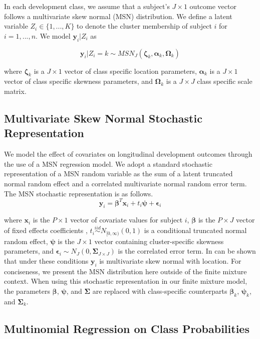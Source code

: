 \documentclass[useAMS,referee]{biom}
\begin{document}
In each development class, we assume that a subject's $J\times 1$ outcome vector follows a multivariate skew normal (MSN) distribution. We define a latent variable $Z_i \in \{1,...,K\}$ to denote the cluster membership of subject $i$ for $i = 1,...,n$. We model $\mathbf{y}_{i}|Z_i$ as 

$$\mathbf{y}_{i}|Z_i = k \sim MSN_J(\boldsymbol\zeta_k,\boldsymbol\alpha_k,\boldsymbol\Omega_k)$$

where $\boldsymbol\zeta_k$ is a $J \times 1$ vector of class specific location parameters, $\boldsymbol\alpha_k$ is a $J \times 1$ vector of class specific skewness parameters, and $\boldsymbol\Omega_k$ is a $J \times J$ class specific scale matrix.

\subsection{Multivariate Skew Normal Stochastic Representation}

We model the effect of covariates on longitudinal development outcomes through the use of a MSN regression model. We adopt a standard stochastic representation of a MSN random variable as the sum of a latent truncated normal random effect and a correlated multivariate normal random error term. The MSN stochastic representation is as follows.
$$\mathbf{y}_{i} = \boldsymbol\beta^T \mathbf{x}_{i} + t_{i}\boldsymbol\psi + \boldsymbol\epsilon_{i}$$

where $\mathbf{x}_i$ is the $P \times 1$ vector of covariate values for subject $i$, $\boldsymbol\beta$ is the $P \times J$ vector of fixed effects coefficients , $t_i \stackrel{iid}{\sim} N_{[0,\infty)}(0,1)$ is a conditional truncated normal random effect, $\boldsymbol\psi$ is the $J \times 1$ vector containing cluster-specific skewness parameters, and $\boldsymbol\epsilon_i \sim N_J(0,\boldsymbol\Sigma_{J \times J})$ is the correlated error term. In can be shown that under these conditions $\mathbf{y}_i$ is multivariate skew normal with location. For conciseness, we present the MSN distribution here outside of the finite mixture context. When using this stochastic representation in our finite mixture model, the parameters $\boldsymbol\beta$, $\boldsymbol\psi$, and $\boldsymbol\Sigma$ are replaced with class-specific counterparts $\boldsymbol\beta_k$, $\boldsymbol\psi_k$, and $\boldsymbol\Sigma_k$.

\subsection{Multinomial Regression on Class Probabilities}
\end{document}

